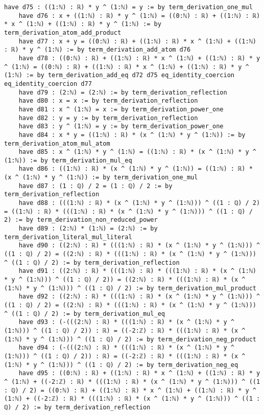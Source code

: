\documentclass{article}
\begin{document}
\begin{tcolorbox}[colback=white!10, width=\linewidth]
\begin{lstlisting}[language=Lean4]
    have d75 : ((1:ℕ) : ℝ) * y ^ (1:ℕ) = y := by term_derivation_one_mul
    have d76 : x + ((1:ℕ) : ℝ) * y ^ (1:ℕ) = ((0:ℕ) : ℝ) + ((1:ℕ) : ℝ) * x ^ (1:ℕ) + ((1:ℕ) : ℝ) * y ^ (1:ℕ) := by term_derivation_atom_add_product
    have d77 : x + y = ((0:ℕ) : ℝ) + ((1:ℕ) : ℝ) * x ^ (1:ℕ) + ((1:ℕ) : ℝ) * y ^ (1:ℕ) := by term_derivation_add_atom d76
    have d78 : ((0:ℕ) : ℝ) + ((1:ℕ) : ℝ) * x ^ (1:ℕ) + ((1:ℕ) : ℝ) * y ^ (1:ℕ) = ((0:ℕ) : ℝ) + ((1:ℕ) : ℝ) * x ^ (1:ℕ) + ((1:ℕ) : ℝ) * y ^ (1:ℕ) := by term_derivation_add_eq d72 d75 eq_identity_coercion eq_identity_coercion d77
    have d79 : (2:ℕ) = (2:ℕ) := by term_derivation_reflection
    have d80 : x = x := by term_derivation_reflection
    have d81 : x ^ (1:ℕ) = x := by term_derivation_power_one
    have d82 : y = y := by term_derivation_reflection
    have d83 : y ^ (1:ℕ) = y := by term_derivation_power_one
    have d84 : x * y = ((1:ℕ) : ℝ) * (x ^ (1:ℕ) * y ^ (1:ℕ)) := by term_derivation_atom_mul_atom
    have d85 : x ^ (1:ℕ) * y ^ (1:ℕ) = ((1:ℕ) : ℝ) * (x ^ (1:ℕ) * y ^ (1:ℕ)) := by term_derivation_mul_eq
    have d86 : ((1:ℕ) : ℝ) * (x ^ (1:ℕ) * y ^ (1:ℕ)) = ((1:ℕ) : ℝ) * (x ^ (1:ℕ) * y ^ (1:ℕ)) := by term_derivation_one_mul
    have d87 : (1 : ℚ) / 2 = (1 : ℚ) / 2 := by term_derivation_reflection
    have d88 : (((1:ℕ) : ℝ) * (x ^ (1:ℕ) * y ^ (1:ℕ))) ^ ((1 : ℚ) / 2) = ((1:ℕ) : ℝ) * (((1:ℕ) : ℝ) * (x ^ (1:ℕ) * y ^ (1:ℕ))) ^ ((1 : ℚ) / 2) := by term_derivation_non_reduced_power
    have d89 : (2:ℕ) * (1:ℕ) = (2:ℕ) := by term_derivation_literal_mul_literal
    have d90 : ((2:ℕ) : ℝ) * (((1:ℕ) : ℝ) * (x ^ (1:ℕ) * y ^ (1:ℕ))) ^ ((1 : ℚ) / 2) = ((2:ℕ) : ℝ) * (((1:ℕ) : ℝ) * (x ^ (1:ℕ) * y ^ (1:ℕ))) ^ ((1 : ℚ) / 2) := by term_derivation_reflection
    have d91 : ((2:ℕ) : ℝ) * (((1:ℕ) : ℝ) * (((1:ℕ) : ℝ) * (x ^ (1:ℕ) * y ^ (1:ℕ))) ^ ((1 : ℚ) / 2)) = ((2:ℕ) : ℝ) * (((1:ℕ) : ℝ) * (x ^ (1:ℕ) * y ^ (1:ℕ))) ^ ((1 : ℚ) / 2) := by term_derivation_mul_product
    have d92 : ((2:ℕ) : ℝ) * (((1:ℕ) : ℝ) * (x ^ (1:ℕ) * y ^ (1:ℕ))) ^ ((1 : ℚ) / 2) = ((2:ℕ) : ℝ) * (((1:ℕ) : ℝ) * (x ^ (1:ℕ) * y ^ (1:ℕ))) ^ ((1 : ℚ) / 2) := by term_derivation_mul_eq
    have d93 : (-(((2:ℕ) : ℝ) * (((1:ℕ) : ℝ) * (x ^ (1:ℕ) * y ^ (1:ℕ))) ^ ((1 : ℚ) / 2)) : ℝ) = ((-2:ℤ) : ℝ) * (((1:ℕ) : ℝ) * (x ^ (1:ℕ) * y ^ (1:ℕ))) ^ ((1 : ℚ) / 2) := by term_derivation_neg_product
    have d94 : (-(((2:ℕ) : ℝ) * (((1:ℕ) : ℝ) * (x ^ (1:ℕ) * y ^ (1:ℕ))) ^ ((1 : ℚ) / 2)) : ℝ) = ((-2:ℤ) : ℝ) * (((1:ℕ) : ℝ) * (x ^ (1:ℕ) * y ^ (1:ℕ))) ^ ((1 : ℚ) / 2) := by term_derivation_neg_eq
    have d95 : ((0:ℕ) : ℝ) + ((1:ℕ) : ℝ) * x ^ (1:ℕ) + ((1:ℕ) : ℝ) * y ^ (1:ℕ) + ((-2:ℤ) : ℝ) * (((1:ℕ) : ℝ) * (x ^ (1:ℕ) * y ^ (1:ℕ))) ^ ((1 : ℚ) / 2) = ((0:ℕ) : ℝ) + ((1:ℕ) : ℝ) * x ^ (1:ℕ) + ((1:ℕ) : ℝ) * y ^ (1:ℕ) + ((-2:ℤ) : ℝ) * (((1:ℕ) : ℝ) * (x ^ (1:ℕ) * y ^ (1:ℕ))) ^ ((1 : ℚ) / 2) := by term_derivation_reflection

\end{lstlisting}
\end{tcolorbox}
\end{document}
